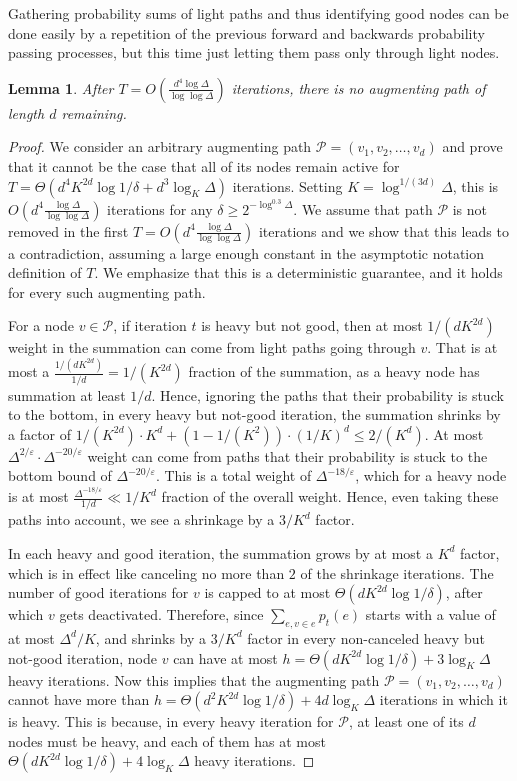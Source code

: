 \documentclass[11pt]{article}
\newtheorem{lemma}[theorem]{Lemma}
\newcommand{\eps}{\varepsilon}
\begin{document}
Gathering probability sums of light paths and thus identifying good nodes can be done easily by a repetition of the previous forward and backwards probability passing processes, but this time just letting them pass only through light nodes.

\begin{lemma} After $T=O(\frac{d^4\log \Delta}{\log\log \Delta})$ iterations, there is no augmenting path of length $d$ remaining.
\end{lemma}
\begin{proof} We consider an arbitrary augmenting path $\mathcal{P}=(v_1, v_2, \dots, v_d)$ and prove that it cannot be the case that all of its nodes remain active for $T=\Theta(d^4K^{2d}\log 1/\delta + d^3\log_{K}{\Delta})$ iterations. Setting $K=\log^{1/(3d)} \Delta$, this is $O(d^4 \frac{\log \Delta}{\log\log \Delta})$ iterations for any $\delta\geq 2^{-\log^{0.3} \Delta}$. We assume that path $\mathcal{P}$ is not removed in the first $T=O(d^4 \frac{\log \Delta}{\log\log \Delta})$ iterations and we show that this leads to a contradiction, assuming a large enough constant in the asymptotic notation definition of $T$.  We emphasize that this is a deterministic guarantee, and it holds for every such augmenting path.

For a node $v \in \mathcal{P}$, if iteration $t$ is heavy but not good, then at most $1/(dK^{2d})$ weight in the summation can come from light paths going through $v$. That is at most a $\frac{1/(dK^{2d})}{1/d} =1/(K^{2d})$ fraction of the summation, as a heavy node has summation at least $1/d$.  Hence, ignoring the paths that their probability is stuck to the bottom, in every heavy but not-good iteration, the summation shrinks by a factor of $1/(K^{2d}) \cdot K^d + (1-1/(K^2)) \cdot (1/K)^d \leq 2/(K^d)$. At most $\Delta^{2/\eps} \cdot \Delta^{-20/\eps}$ weight can come from paths that their probability is stuck to the bottom bound of $\Delta^{-20/\eps}$. This is a total weight of $\Delta^{-18/\eps}$, which for a heavy node is at most $\frac{\Delta^{-18/\eps}}{1/d} \ll 1/K^d$ fraction of the overall weight.  Hence, even taking these paths into account, we see a shrinkage by a $3/K^d$ factor.

In each heavy and good iteration, the summation grows by at most a $K^d$ factor, which is in effect like canceling no more than $2$ of the shrinkage iterations. The number of good iterations for $v$ is capped to at most $\Theta(dK^{2d}\log 1/\delta)$, after which $v$ gets deactivated. Therefore, since $\sum_{e, v\in e} p_{t}(e)$ starts with a value of at most $\Delta^d/K$, and shrinks by a $3/K^{d}$ factor in every non-canceled heavy but not-good iteration, node $v$ can have at most $h=\Theta(dK^{2d}\log 1/\delta) + 3\log_{K}{\Delta}$ heavy iterations. Now this implies that the augmenting path $\mathcal{P}=(v_1, v_2, \dots, v_d)$ cannot have more than $h=\Theta(d^2K^{2d}\log 1/\delta) + 4d\log_{K}{\Delta}$ iterations in which it is heavy. This is because, in every heavy iteration for $\mathcal{P}$, at least one of its $d$ nodes must be heavy, and each of them has at most $\Theta(dK^{2d}\log 1/\delta) + 4\log_{K}{\Delta}$ heavy iterations.


\end{proof}
\end{document}
